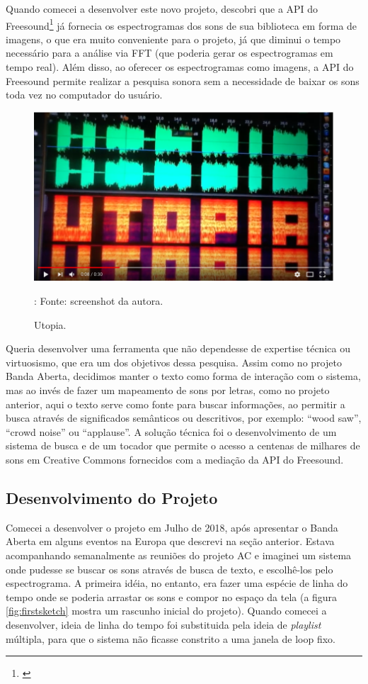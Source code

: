 Quando comecei a desenvolver este novo projeto, descobri que a API do Freesound\footnote{\cite{Akkermans2011}} já fornecia os espectrogramas dos sons de sua biblioteca em forma de imagens, o que era muito conveniente para o projeto, já que diminui o tempo necessário para a análise via FFT (que poderia gerar os espectrogramas em tempo real). Além disso, ao oferecer os espectrogramas como imagens, a API do Freesound permite realizar a pesquisa sonora sem a necessidade de baixar os sons toda vez no computador do usuário.

\begin{figure}
\includegraphics[width=1\textwidth]{pictures/cap4/utopia}
\caption{\label{utopia}Utopia.}
\legend: Fonte: screenshot da autora.
\end{figure}

Queria desenvolver uma ferramenta que não dependesse de expertise técnica ou virtuosismo, que era um dos objetivos dessa pesquisa. Assim como no projeto Banda Aberta, decidimos manter o texto como forma de interação com o sistema, mas ao invés de fazer um mapeamento de sons por letras, como no projeto anterior, aqui o texto serve como fonte para buscar informações, ao permitir a busca através de significados semânticos ou descritivos, por exemplo: ``wood saw'', ``crowd noise'' ou ``applause''. A solução técnica foi o desenvolvimento de um sistema de busca e de um tocador que permite o acesso a centenas de milhares de sons em Creative Commons fornecidos com a mediação da API do Freesound.


\subsection{Desenvolvimento do Projeto}

Comecei a desenvolver o projeto em Julho de 2018, após apresentar o Banda Aberta em alguns eventos na Europa que descrevi na seção anterior. Estava acompanhando semanalmente as reuniões do projeto AC e imaginei um sistema onde pudesse se buscar os sons através de busca de texto, e escolhê-los pelo espectrograma. A primeira idéia, no entanto, era fazer uma espécie de linha do tempo onde se poderia arrastar os sons e compor no espaço da tela (a figura \ref{fig:firstsketch} mostra um rascunho inicial do projeto). Quando comecei a desenvolver, ideia de linha do tempo foi substituida pela ideia de \emph{playlist} múltipla, para que o sistema não ficasse constrito a uma janela de loop fixo. 

